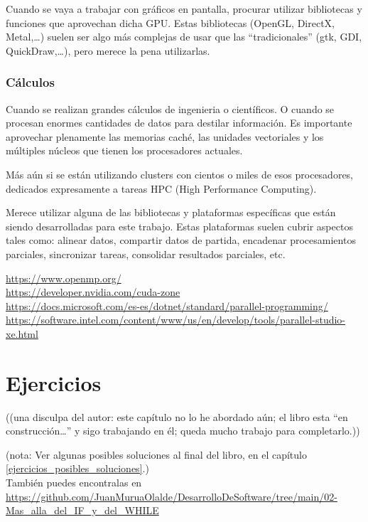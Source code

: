\documentclass[spanish,12pt,a4paper,final,oneside]{book}
\begin{document}
Cuando se vaya a trabajar con gráficos en pantalla, procurar utilizar bibliotecas y funciones que aprovechan dicha GPU. Estas bibliotecas (OpenGL, DirectX, Metal,\ldots) suelen ser algo más complejas de usar que las ``tradicionales'' (gtk, GDI, QuickDraw,\ldots), pero merece la pena utilizarlas.


\subsection{Cálculos}
Cuando se realizan grandes cálculos de ingenieria o científicos. O cuando se procesan enormes cantidades de datos para destilar información. Es importante aprovechar plenamente las memorias caché, las unidades vectoriales y los múltiples núcleos que tienen los procesadores actuales. 

Más aún si se están utilizando clusters con cientos o miles de esos procesadores, dedicados expresamente a tareas HPC (High Performance Computing). 

Merece utilizar alguna de las bibliotecas y plataformas específicas que están siendo desarrolladas para este trabajo. Estas plataformas suelen cubrir aspectos tales como: alinear datos, compartir datos de partida, encadenar procesamientos parciales, sincronizar tareas, consolidar resultados parciales, etc.

\url{https://www.openmp.org/}
\\ \url{https://developer.nvidia.com/cuda-zone}
\\ \url{https://docs.microsoft.com/es-es/dotnet/standard/parallel-programming/}
\\ \url{https://software.intel.com/content/www/us/en/develop/tools/parallel-studio-xe.html}


\chapter{Ejercicios}\label{ejercicios_paralelismo}

\begin{footnotesize}((una disculpa del autor: este capítulo no lo he abordado aún; el libro esta ``en construcción\ldots'' y sigo trabajando en él; queda mucho trabajo para completarlo.))\end{footnotesize}

(nota: Ver algunas posibles soluciones al final del libro, en el capítulo \ref{ejercicios_posibles_soluciones}.)
\\{\scriptsize También puedes encontralas en \url{https://github.com/JuanMuruaOlalde/DesarrolloDeSoftware/tree/main/02-Mas_alla_del_IF_y_del_WHILE}}
\end{document}
